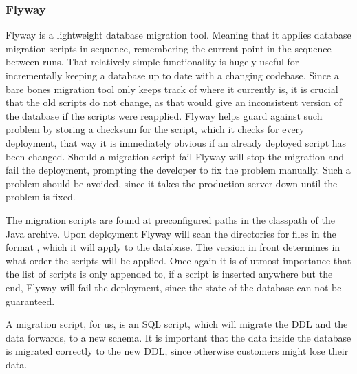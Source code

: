 \subsubsection{Flyway}\label{subsubsec:flyway}
Flyway is a lightweight database migration tool.
Meaning that it applies database migration scripts in sequence, remembering the current point in the sequence between runs.
That relatively simple functionality is hugely useful for incrementally keeping a database up to date with a changing codebase.
Since a bare bones migration tool only keeps track of where it currently is, it is crucial that the old scripts do not change, as that would give an inconsistent version of the database if the scripts were reapplied.
Flyway helps guard against such problem by storing a checksum for the script, which it checks for every deployment, that way it is immediately obvious if an already deployed script has been changed.
Should a migration script fail Flyway will stop the migration and fail the deployment, prompting the developer to fix the problem manually.
Such a problem should be avoided, since it takes the production server down until the problem is fixed.

The migration scripts are found at preconfigured paths in the classpath of the Java archive.
Upon deployment Flyway will scan the directories for files in the format , which it will apply to the database.
The version in front determines in what order the scripts will be applied.
Once again it is of utmost importance that the list of scripts is only appended to, if a script is inserted anywhere but the end, Flyway will fail the deployment, since the state of the database can not be guaranteed.

A migration script, for us, is an SQL script, which will migrate the \ac{DDL} and the data forwards, to a new schema.
It is important that the data inside the database is migrated correctly to the new \ac{DDL}, since otherwise customers might lose their data.
